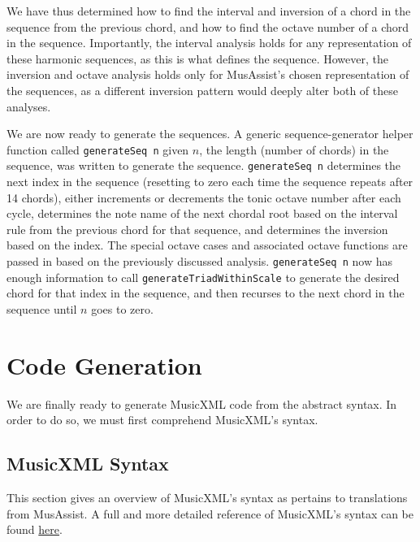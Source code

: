\documentclass{report}
\begin{document}
We have thus determined how to find the interval and inversion of a chord in the sequence from the previous chord, and how to find the octave number of a chord in the sequence. Importantly, the interval analysis holds for any representation of these harmonic sequences, as this is what defines the sequence. However, the inversion and octave analysis holds only for MusAssist's chosen representation of the sequences, as a different inversion pattern would deeply alter both of these analyses.

We are now ready to generate the sequences. A generic sequence-generator helper function called \verb.generateSeq n. given $n$, the length (number of chords) in the sequence, was written to generate the sequence. \verb.generateSeq n. determines the next index  in the sequence (resetting to zero each  time the sequence repeats after 14 chords), either  increments or decrements the tonic octave number after each cycle, determines the note name of the next chordal root based on the interval rule from the previous chord for that sequence, and determines the inversion based on the index. The special octave cases and associated octave functions are passed in based on the previously discussed analysis. \verb.generateSeq n. now has enough information to call  \verb.generateTriadWithinScale. to generate the desired chord for that index in the sequence, and then recurses to the next chord in the sequence until $n$ goes to zero. 

\chapter{Code Generation}
\label{chap:codegen}
We are finally ready to generate MusicXML code from the abstract syntax. In order to do so, we must first comprehend MusicXML's syntax. 

\section{MusicXML Syntax}
This section gives an overview of MusicXML's syntax as pertains to translations from MusAssist. A full and more detailed reference of MusicXML's syntax can be found \href{https://www.w3.org/2021/06/musicxml40/}{here}.
\end{document}
